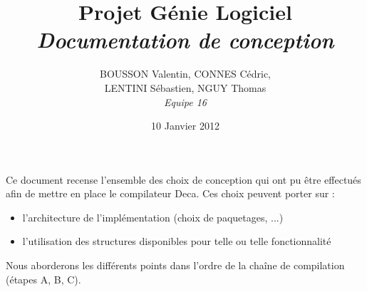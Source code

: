 \documentclass[11pt]{article}
\title{Projet Génie Logiciel\\\emph{Documentation de conception}}
\author{BOUSSON Valentin, CONNES Cédric,\\LENTINI Sébastien, NGUY Thomas\\\emph{Equipe 16}}
\date{10 Janvier 2012}
\begin{document}
\maketitle

Ce document recense l'ensemble des choix de conception qui ont pu être effectués afin de mettre en place le compilateur Deca. Ces choix peuvent porter sur :
\begin{itemize}
\item l'architecture de l'implémentation (choix de paquetages, ...)
\item l'utilisation des structures disponibles pour telle ou telle fonctionnalité
\end{itemize}

  Nous aborderons les différents points dans l'ordre de la chaîne de compilation (étapes A, B, C).


\newpage

\newpage

\end{document}

